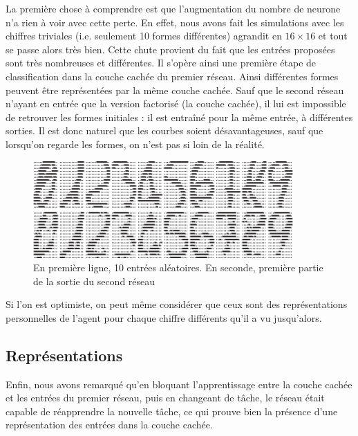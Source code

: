 \documentclass[a4paper,12pt, twoside]{article}
\begin{document}
\newline La première chose à comprendre est que l'augmentation
du nombre de neurone n'a rien à voir avec cette perte. En effet, nous avons fait les 
simulations avec les chiffres triviales (i.e. seulement 10 formes différentes) agrandit en $16 \times 16$
et tout se passe alors très bien.
\newline
Cette chute provient du fait que les entrées proposées sont très nombreuses et différentes. Il s'opère ainsi
une première étape de classification dans la couche cachée du premier réseau.
Ainsi différentes formes peuvent être représentées par la même couche cachée.
Sauf que le second réseau n'ayant en entrée que la version factorisé (la couche cachée), il lui 
est impossible de retrouver les formes initiales : il est entraîné pour la même entrée, à différentes 
sorties.
Il est donc naturel que les courbes soient désavantageuses, sauf que lorsqu'on regarde les formes, 
on n'est pas si loin de la réalité.

\begin{figure}[H]
\begin{center}
 \includegraphics[height=140px]{metarepre.png}
\end{center}
\caption{ En première ligne, 10 entrées aléatoires. En seconde, première partie de la sortie du second réseau}
\end{figure}

Si l'on est optimiste, on peut même considérer que ceux sont des représentations personnelles de 
l'agent pour chaque chiffre différents qu'il a vu jusqu'alors.


\subsection{Représentations}

Enfin, nous avons remarqué qu'en bloquant l'apprentissage entre la couche cachée et les 
entrées du premier réseau, puis en changeant de tâche, le réseau était capable de réapprendre
la nouvelle tâche, ce qui prouve bien la présence d'une représentation des entrées dans la couche 
cachée.
\end{document}

